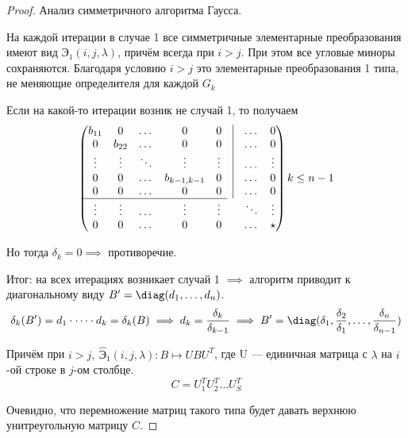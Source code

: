 \begin{proof}
    Анализ симметричного алгоритма Гаусса.

    На каждой итерации в случае 1 все симметричные элементарные преобразования имеют вид $\text{Э}_{1}(i, j, \lambda)$, причём всегда при $i > j$. 
    При этом все угловые миноры сохраняются. Благодаря условию $i > j$ это элементарные преобразования 1 типа, не меняющие определителя для каждой $G_{k}$

    Если на какой-то итерации возник не случай 1, то получаем 
    \begin{equation*}
        \begin{pmatrix}
            b_{11} & 0       & \dots  & 0       & 0       & \vline & \dots & 0 \\
            0       & b_{22} & \dots  & 0       & 0       & \vline & \dots & 0 \\
            \vdots  & \vdots  & \ddots & \vdots  & \vdots  & \vline & \dots & \vdots \\
            0       & 0       & \dots  & b_{k-1, k-1} & 0   & \vline & \dots & 0 \\
            0       & 0       & \dots  & 0       & 0       & \vline & \dots & 0 \\
            \cline{1-5}
            \vdots  & \vdots  & \dots  & \vdots  & \vdots  &        & \ddots & \vdots \\
            0       & 0       & \dots  & 0       & 0       &        & \dots & \star
            \end{pmatrix}
            k \leq n-1
        \end{equation*}

    Но тогда $\delta_{k} = 0 \implies$ противоречие.

    Итог: на всех итерациях возникает случай 1 $\implies$ алгоритм приводит к диагональному виду $B' = \diag(d_{1}, \dots, d_{n})$.
    \begin{equation*}
        \delta_{k}(B') = d_{1} \cdot \dots \cdot d_{k} = \delta_{k}(B) \implies d_{k} = \frac{\delta_{k}}{\delta_{k - 1}} \implies B' = \diag(\delta_{1}, \frac{\delta_{2}}{\delta_{1}}, \dots, \frac{\delta_{n}}{\delta_{n - 1}})
    \end{equation*}

    Причём при $i > j, \ \widehat{\text{Э}}_{1} (i, j, \lambda) \colon B \mapsto U B U^{T}$, где U --- единичная матрица с $\lambda$ на $i$-ой строке в $j$-ом столбце.
    \begin{equation*}
        C = U_{1}^{T} U_{2}^{T} \dots U_{S}^{T}
    \end{equation*}

    Очевидно, что перемножение матриц такого типа будет давать верхнюю унитреугольную матрицу $C$.
\end{proof}

